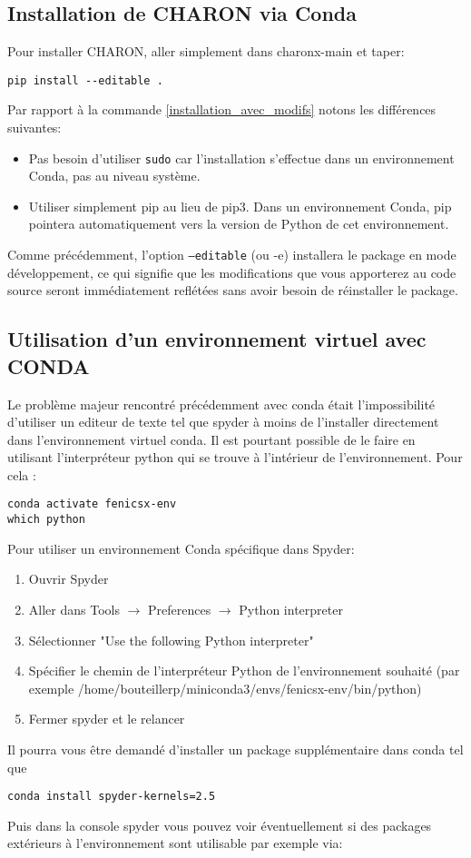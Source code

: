 \documentclass[10pt]{book}
\begin{document}
\subsection{Installation de CHARON via Conda}
Pour installer CHARON, aller simplement dans charonx-main et taper:
\begin{verbatim}
pip install --editable . 
\end{verbatim}
Par rapport à la commande \eqref{installation_avec_modifs} notons les différences suivantes:
\begin{itemize}
\item Pas besoin d'utiliser \texttt{sudo} car l'installation s'effectue dans un environnement Conda, pas au niveau système.
\item Utiliser simplement pip au lieu de pip3. Dans un environnement Conda, pip pointera automatiquement vers la version de Python de cet environnement.
\end{itemize}
Comme précédemment, l'option \texttt{--editable} (ou -e) installera le package en mode développement, ce qui signifie que les modifications que vous apporterez au code source seront immédiatement reflétées sans avoir besoin de réinstaller le package.
\subsection{Utilisation d'un environnement virtuel avec CONDA}
Le problème majeur rencontré précédemment avec conda était l'impossibilité d'utiliser un editeur de texte tel que spyder à moins de l'installer directement dans l'environnement virtuel conda. Il est pourtant possible de le faire en utilisant l’interpréteur python qui se trouve à l'intérieur de l'environnement. Pour cela :
\begin{center}
\begin{verbatim}
conda activate fenicsx-env
which python
\end{verbatim}
\end{center}
Pour utiliser un environnement Conda spécifique dans Spyder:
\begin{enumerate}
    \item Ouvrir Spyder
    \item Aller dans Tools $\rightarrow$ Preferences $\rightarrow$ Python interpreter
    \item Sélectionner "Use the following Python interpreter"
    \item Spécifier le chemin de l'interpréteur Python de l'environnement souhaité (par exemple /home/bouteillerp/miniconda3/envs/fenicsx-env/bin/python)
    \item Fermer spyder et le relancer
\end{enumerate}
Il pourra vous être demandé d'installer un package supplémentaire dans conda tel que
\begin{verbatim}
conda install spyder-kernels=2.5
\end{verbatim}
Puis dans la console spyder vous pouvez voir éventuellement si des packages extérieurs à l'environnement sont utilisable par exemple via:
\end{document}
